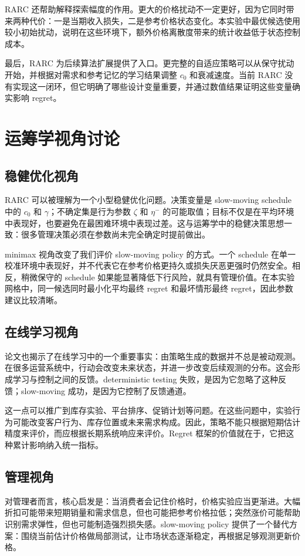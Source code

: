 \documentclass[conference]{../../LaTex_Template/IEEEtran}
\begin{document}
RARC 还帮助解释探索幅度的作用。更大的价格扰动不一定更好，因为它同时带来两种代价：一是当期收入损失，二是参考价格状态变化。本实验中最优候选使用较小初始扰动，说明在这些环境下，额外价格离散度带来的统计收益低于状态控制成本。

最后，RARC 为后续算法扩展提供了入口。更完整的自适应策略可以从保守扰动开始，并根据对需求和参考记忆的学习结果调整 $c_0$ 和衰减速度。当前 RARC 没有实现这一闭环，但它明确了哪些设计变量重要，并通过数值结果证明这些变量确实影响 regret。

\section{运筹学视角讨论}
\subsection{稳健优化视角}
RARC 可以被理解为一个小型稳健优化问题。决策变量是 slow-moving schedule 中的 $c_0$ 和 $\gamma$；不确定集是行为参数 $\zeta$ 和 $\eta^-$ 的可能取值；目标不仅是在平均环境中表现好，也要避免在最困难环境中表现过差。这与运筹学中的稳健决策思想一致：很多管理决策必须在参数尚未完全确定时提前做出。

minimax 视角改变了我们评价 slow-moving policy 的方式。一个 schedule 在单一校准环境中表现好，并不代表它在参考价格更持久或损失厌恶更强时仍然安全。相反，稍微保守的 schedule 如果能显著降低下行风险，就具有管理价值。在本实验网格中，同一候选同时最小化平均最终 regret 和最坏情形最终 regret，因此参数建议比较清晰。

\subsection{在线学习视角}
论文也揭示了在线学习中的一个重要事实：由策略生成的数据并不总是被动观测。在很多运营系统中，行动会改变未来状态，并进一步改变后续观测的分布。这会形成学习与控制之间的反馈。deterministic testing 失败，是因为它忽略了这种反馈；slow-moving 成功，是因为它控制了反馈通道。

这一点可以推广到库存实验、平台排序、促销计划等问题。在这些问题中，实验行为可能改变客户行为、库存位置或未来需求构成。因此，策略不能只根据短期估计精度来评价，而应根据长期系统响应来评价。Regret 框架的价值就在于，它把这种累计影响纳入统一指标。

\subsection{管理视角}
对管理者而言，核心启发是：当消费者会记住价格时，价格实验应当更渐进。大幅折扣可能带来短期销量和需求信息，但也可能把参考价格拉低；突然涨价可能帮助识别需求弹性，但也可能制造强烈损失感。slow-moving policy 提供了一个替代方案：围绕当前估计价格做局部测试，让市场状态逐渐稳定，再根据足够观测更新价格。
\end{document}

